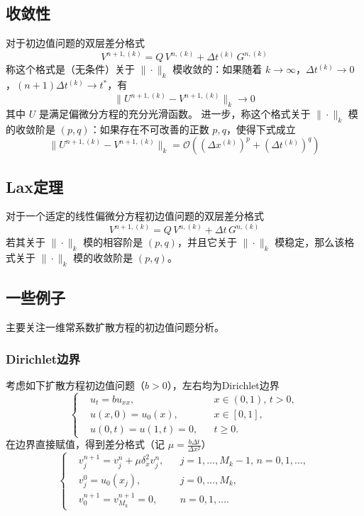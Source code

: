 \subsection{收敛性}


\begin{definition}[模收敛性]
    对于初边值问题的双层差分格式
    \[
        V^{n+1,(k)} = Q \, V^{n,(k)} + \Delta t^{(k)}\, G^{n,(k)}
    \]
    称这个格式是（无条件）关于 $\|\cdot\|_k$ 模收敛的：如果随着 $k \to \infty$，$\Delta t^{(k)} \to 0$，$(n+1) \Delta t^{(k)} \to t^*$，有
    \[
        \|U^{n+1,(k)} - V^{n+1,(k)}\|_{k} \to 0
    \]
    其中 $U$ 是满足偏微分方程的充分光滑函数。
    进一步，称这个格式关于 $\|\cdot\|_k$ 模的收敛阶是 $(p,q)$：如果存在不可改善的正数 $p,q$，使得下式成立
    \[
        \|U^{n+1,(k)} - V^{n+1,(k)}\|_{k} = \mathcal{O}((\Delta x^{(k)})^p + (\Delta t^{(k)})^q)
    \]
\end{definition}


\subsection{Lax定理}


\begin{theorem}[Lax定理]
    对于一个适定的线性偏微分方程初边值问题的双层差分格式
    \[
        V^{n+1,(k)} = Q \, V^{n,(k)} + \Delta t\, G^{n,(k)}
    \]
    若其关于 $\|\cdot\|_k$ 模的相容阶是 $(p,q)$，并且它关于 $\|\cdot\|_k$ 模稳定，那么该格式关于 $\|\cdot\|_k$ 模的收敛阶是 $(p,q)$。
\end{theorem}

\subsection{一些例子}

主要关注一维常系数扩散方程的初边值问题分析。

\subsubsection{Dirichlet边界}

考虑如下扩散方程初边值问题（$b > 0$），左右均为Dirichlet边界
\[
    \left\{
    \begin{aligned}
         & u_t = b u_{xx},      &  & x \in (0,1),\, t > 0, \\
         & u(x,0) = u_0(x),     &  & x \in [0,1],          \\
         & u(0,t) = u(1,t) = 0, &  & t \ge 0.
    \end{aligned}
    \right.
\]
在边界直接赋值，得到差分格式（记 $\mu = \frac{ b \Delta t}{\Delta x^2}$）
\begin{equation}
    \left\{
    \begin{aligned}
         & v_j^{n+1} = v_j^n + \mu \delta_x^2 v_j^n, &  & j=1,\dots,M_k-1,\, n=0,1,\dots, \\
         & v_j^0 = u_0(x_j),                         &  & j=0,\dots,M_k,                  \\
         & v_0^{n+1} = v_{M_k}^{n+1} = 0,            &  & n=0,1,\dots.
    \end{aligned}
    \right. \label{eq:ib-1}
\end{equation}


